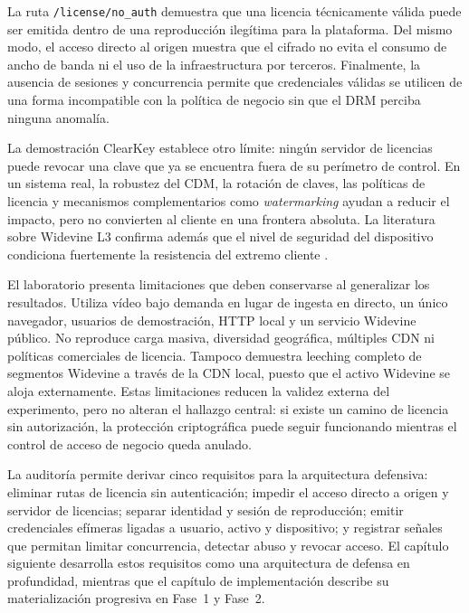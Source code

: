 La ruta \nolinkurl{/license/no_auth} demuestra que una licencia técnicamente válida puede ser emitida dentro de una reproducción ilegítima para la plataforma. Del mismo modo, el acceso directo al origen muestra que el cifrado no evita el consumo de ancho de banda ni el uso de la infraestructura por terceros. Finalmente, la ausencia de sesiones y concurrencia permite que credenciales válidas se utilicen de una forma incompatible con la política de negocio sin que el DRM perciba ninguna anomalía.

La demostración ClearKey establece otro límite: ningún servidor de licencias puede revocar una clave que ya se encuentra fuera de su perímetro de control. En un sistema real, la robustez del CDM, la rotación de claves, las políticas de licencia y mecanismos complementarios como \textit{watermarking} ayudan a reducir el impacto, pero no convierten al cliente en una frontera absoluta. La literatura sobre Widevine L3 confirma además que el nivel de seguridad del dispositivo condiciona fuertemente la resistencia del extremo cliente \cite{patat2022,rafi2023mobiledrm}.

El laboratorio presenta limitaciones que deben conservarse al generalizar los resultados. Utiliza vídeo bajo demanda en lugar de ingesta en directo, un único navegador, usuarios de demostración, HTTP local y un servicio Widevine público. No reproduce carga masiva, diversidad geográfica, múltiples CDN ni políticas comerciales de licencia. Tampoco demuestra leeching completo de segmentos Widevine a través de la CDN local, puesto que el activo Widevine se aloja externamente. Estas limitaciones reducen la validez externa del experimento, pero no alteran el hallazgo central: si existe un camino de licencia sin autorización, la protección criptográfica puede seguir funcionando mientras el control de acceso de negocio queda anulado.

La auditoría permite derivar cinco requisitos para la arquitectura defensiva: eliminar rutas de licencia sin autenticación; impedir el acceso directo a origen y servidor de licencias; separar identidad y sesión de reproducción; emitir credenciales efímeras ligadas a usuario, activo y dispositivo; y registrar señales que permitan limitar concurrencia, detectar abuso y revocar acceso. El capítulo siguiente desarrolla estos requisitos como una arquitectura de defensa en profundidad, mientras que el capítulo de implementación describe su materialización progresiva en Fase~1 y Fase~2.
